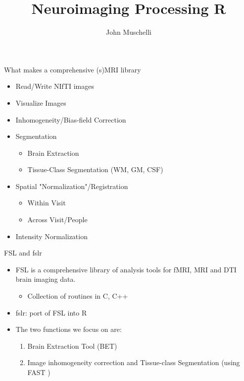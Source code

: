 \documentclass[11pt]{beamer}\usepackage[]{graphicx}\usepackage[]{color}
\author{John Muschelli}
\title{Neuroimaging Processing R}
\institute{Johns Hopkins Bloomberg School of Public Health}
\begin{document}
\begin{frame}
\titlepage
\end{frame}





\begin{frame}[fragile]{What makes a comprehensive (s)MRI library}

\begin{itemize}

\item Read/Write NIfTI images
\item Visualize Images
\item Inhomogeneity/Bias-field Correction
\item Segmentation
  \begin{itemize}
    \item Brain Extraction
    \item Tissue-Class Segmentation (WM, GM, CSF)
  \end{itemize}
\item Spatial "Normalization"/Registration 
  \begin{itemize}
    \item Within Visit
    \item Across Visit/People
  \end{itemize}
\item Intensity Normalization

\end{itemize}
\end{frame}

\begin{frame}[fragile]{FSL and fslr}

\begin{itemize}
\item FSL is a comprehensive library of analysis tools for fMRI, MRI and DTI brain imaging data. 
  \begin{itemize}
  \item Collection of routines in C, C++
  \end{itemize}
\item fslr: port of FSL into R
\item The two functions we focus on are: 
\begin{enumerate}
\item Brain Extraction Tool (BET)
\item Image inhomogeneity correction and Tissue-class Segmentation (using FAST \citep{zhang2001segmentation})
\end{enumerate} 
\end{itemize}

\end{frame}
\end{document}
